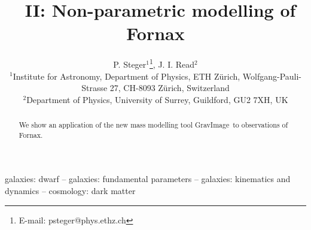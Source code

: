 \documentclass[useAMS,usenatbib]{mn2e}
\title[\GravImage\ II: Mass modelling of dSph]{\GravImage\ II:
  Non-parametric modelling of Fornax}
\author[Steger]{P. Steger$^1$\thanks{E-mail: psteger@phys.ethz.ch}, J. I. Read$^{2}$\\
$^1$Institute for Astronomy, Department of Physics, ETH Z\"urich, Wolfgang-Pauli-Strasse 27, CH-8093 Z\"urich, Switzerland\\
$^2$Department of Physics, University of Surrey, Guildford, GU2 7XH, UK
}
\def\GravImage{{\sc GravImage}}
\begin{document}
\maketitle

\begin{abstract}
    We show an application of the new mass modelling tool \GravImage\ to
    observations of Fornax.
\end{abstract}

\begin{keywords} galaxies: dwarf -- galaxies: fundamental parameters
    -- galaxies: kinematics and dynamics -- cosmology: dark matter
\end{keywords}











\end{document}
